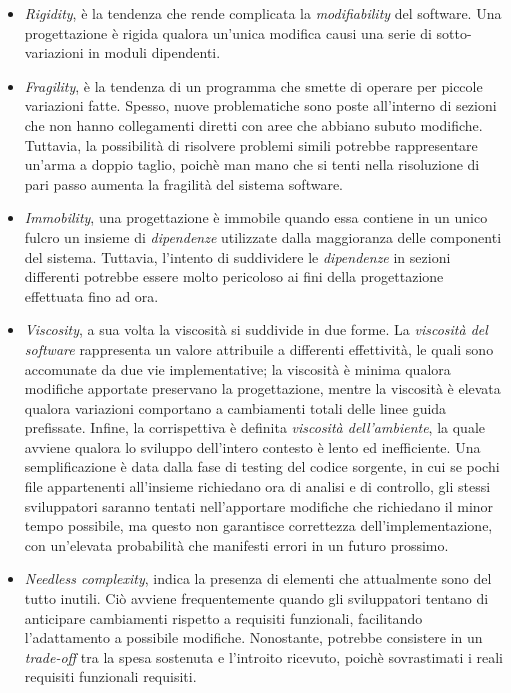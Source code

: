 \documentclass{article}
\begin{document}
\begin{itemize}[label={-}]
    \itemsep0em
    \item \textit{Rigidity}, è la tendenza che rende complicata la \textit{modifiability} del software. Una progettazione è rigida qualora un'unica modifica causi una serie di sotto-variazioni in moduli dipendenti.
    \item \textit{Fragility}, è la tendenza di un programma che smette di operare per piccole variazioni fatte. Spesso, nuove problematiche sono poste all'interno di sezioni che non hanno collegamenti diretti con aree che abbiano subuto modifiche. Tuttavia, la possibilità di risolvere problemi simili potrebbe rappresentare un'arma a doppio taglio, poichè man mano che si tenti nella risoluzione di pari passo aumenta la fragilità del sistema software.
    \item \textit{Immobility}, una progettazione è immobile quando essa contiene in un unico fulcro un insieme di \textit{dipendenze} utilizzate dalla maggioranza delle componenti del sistema. Tuttavia, l'intento di suddividere le \textit{dipendenze} in sezioni differenti potrebbe essere molto pericoloso ai fini della progettazione effettuata fino ad ora.
    \item \textit{Viscosity}, a sua volta la viscosità si suddivide in due forme. La \textit{viscosità del software} rappresenta un valore attribuile a differenti effettività, le quali sono accomunate da due vie implementative; la viscosità è minima qualora modifiche apportate preservano la progettazione, mentre la viscosità è elevata qualora variazioni comportano a cambiamenti totali delle linee guida prefissate. Infine, la corrispettiva è definita \textit{viscosità dell'ambiente}, la quale avviene qualora lo sviluppo dell'intero contesto è lento ed inefficiente. Una semplificazione è data dalla fase di testing del codice sorgente, in cui se pochi file appartenenti all'insieme richiedano ora di analisi e di controllo, gli stessi sviluppatori saranno tentati nell'apportare modifiche che richiedano il minor tempo possibile, ma questo non garantisce correttezza dell'implementazione, con un'elevata probabilità che manifesti errori in un futuro prossimo.
    \item \textit{Needless complexity}, indica la presenza di elementi che attualmente sono del tutto inutili. Ciò avviene frequentemente quando gli sviluppatori tentano di anticipare cambiamenti rispetto a requisiti funzionali, facilitando l'adattamento a possibile modifiche. Nonostante, potrebbe consistere in un \textit{trade-off} tra la spesa sostenuta e l'introito ricevuto, poichè sovrastimati i reali requisiti funzionali requisiti.

\end{itemize}
\end{document}
